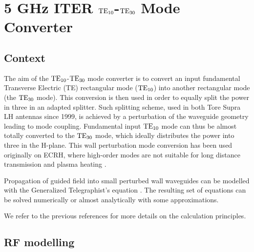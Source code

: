 \clearpage

\section[ITER Mode Converter]{5 GHz ITER ${\mathrm{TE}}_{10}$-${\mathrm{TE}}_{30}$ Mode Converter}\label{sec:mode_converter}

\subsection{Context}
The aim of the ${\mathrm{TE}}_{10}$-${\mathrm{TE}}_{30}$ mode converter is to convert an input fundamental Transverse Electric (TE) rectangular mode (${\mathrm{TE}}_{10}$) into another rectangular mode (the ${\mathrm{TE}}_{30}$ mode). This conversion is then used in order to equally split the power in three in an adapted splitter. Such splitting scheme, used in both Tore Supra LH antennas since 1999, is achieved by a perturbation of the waveguide geometry leading to mode coupling. Fundamental input ${\mathrm{TE}}_{10}$ mode can thus be almost totally converted to the ${\mathrm{TE}}_{30}$ mode, which ideally distributes the power into three in the H-plane. This wall perturbation mode conversion has been used originally on ECRH, where high-order modes are not suitable for long distance transmission and plasma heating . 

Propagation of guided field into small perturbed wall waveguides can be modelled with the Generalized Telegraphist's equation . The resulting set of equations can be solved numerically  or almost analytically with some approximations. 

We refer to the previous references for more details on the calculation principles. 

\subsection{RF modelling}
